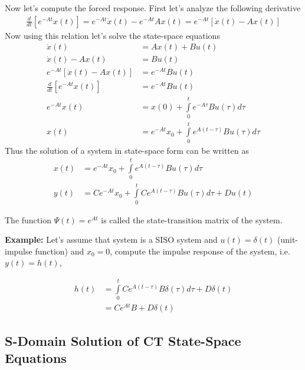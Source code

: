 \documentclass[twoside]{article}
\begin{document}
Now let's compute the forced response. First let's analyze the
following derivative
%
\begin{align*}
\frac{d}{dt} \left[ e^{-A t} x(t) \right] = e^{-A t} \dot{x}(t) - e^{-A t} A
  x(t) = e^{-A t} \left[ \dot{x}(t) - A x(t) \right]
\end{align*}
%
Now using this relation let's solve the state-space equations
%
\begin{align*}
  \dot{x}(t) &= A x(t) + B u(t)
\\ 
  \dot{x}(t) - A x(t) &=  B u(t)
\\
  e^{-A t}  \left[ \dot{x}(t) - A x(t) \right] &=  e^{-A t} B u(t)
\\
  \frac{d}{dt} \left[ e^{-A t} x(t) \right] &=  e^{-A t} B u(t)
\\
  e^{-A t} x(t) &= x(0) + \int\limits_{0}^{t} e^{-A \tau} B u(\tau) d
                  \tau
\\
x(t) &= e^{-A t} x_0 + \int\limits_{0}^{t} e^{A ( t - \tau ) } B u(\tau) d
                  \tau
\end{align*}
%
Thus the solution of a system in state-space form can be written as
%
\begin{align*}
  x(t) &= e^{-A t} x_0 + \int\limits_{0}^{t} e^{A ( t - \tau ) } B u(\tau) d
                  \tau
\\
  y(t) &= C e^{-A t} x_0 + \int\limits_{0}^{t} C e^{A ( t - \tau ) } B u(\tau) d
                  \tau + D u(t)
\end{align*}
%

The function $\Psi(t) = e^{A t}$ is called the state-transition matrix
of the system. 

\textbf{Example:} Let's assume that system is a SISO system and
$u(t) = \delta({t})$ (unit-impulse function) and $x_0 = 0$, compute 
the impulse response of the system, i.e. $y(t) = h(t)$,

\begin{align*}
  h(t) &= \int\limits_{0}^{t} C e^{A ( t - \tau ) } B \delta(\tau) d
                  \tau + D \delta(t)
\\
   &= C e^{A t } B + D \delta(t)
\end{align*}

\subsection*{S-Domain Solution of CT State-Space Equations}
\end{document}
